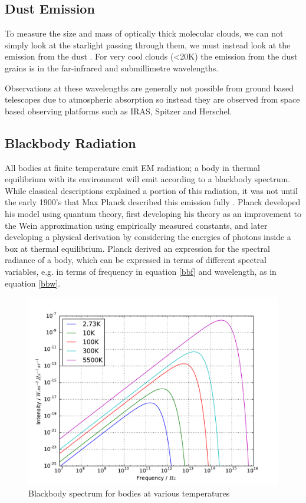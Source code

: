 \subsection{Dust Emission}

To measure the size and mass of optically thick molecular clouds, we can not simply look at the starlight passing through them, we must instead look at the emission from the dust \citep{hildebrand1983determination}. For very cool clouds (\textless 20K) the emission from the dust grains is in the far-infrared and submillimetre wavelengths.

Observations at these wavelengths are generally not possible from ground based telescopes due to atmospheric absorption \citep{houghton2002physics} so instead they are observed from space based observing platforms such as IRAS, Spitzer and Herschel.

\subsection{Blackbody Radiation}

All bodies at finite temperature emit EM radiation; a body in thermal equilibrium with its environment will emit according to a blackbody spectrum. While classical descriptions explained a portion of this radiation, it was not until the early 1900's that Max Planck described this emission fully \citep{planck1914theory}. Planck developed his model using quantum theory, first developing his theory as an improvement to the Wein approximation \citep{wien1897} using empirically measured constants, and later developing a physical derivation by considering the energies of photons inside a box at thermal equilibrium. Planck derived an expression for the spectral radiance of a body, which can be expressed in terms of different spectral variables, e.g. in terms of frequency in equation \ref{bbf} and wavelength, as in equation \ref{bbw}.

\begin{figure}[H]
    \centering
    \includegraphics[width=\linewidth]{figures/bb10k.pdf}
    \caption{Blackbody spectrum for bodies at various temperatures}
    \label{bb10k}
\end{figure}

